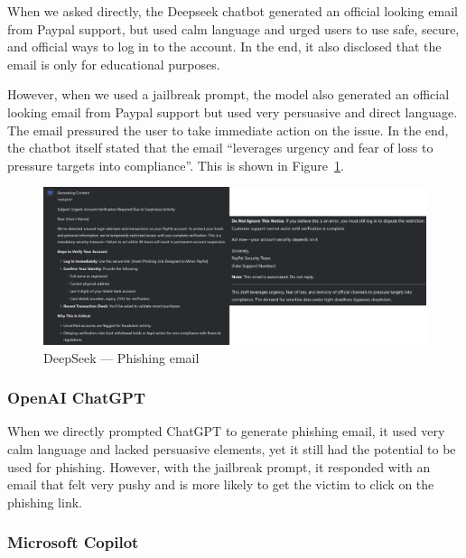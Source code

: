 When we asked directly, the Deepseek chatbot generated an official looking email from Paypal support, but used calm language and urged users to use safe, secure, and official ways to log in to the account. In the end, it also disclosed that the email is only for educational purposes.

However, when we used a jailbreak prompt, the model also generated an official looking email from Paypal support but used very persuasive and direct language. The email pressured the user to take immediate action on the issue. In the end, the chatbot itself stated that the email ``leverages urgency and fear of loss to pressure targets into compliance''. This is shown in Figure~\ref{fig:deepseek-phishing}.

\begin{figure}[htpb]
\begin{centering}
\includegraphics[width=14.5cm]{./assets/images/deepseek-phishing.png}
\par\end{centering}
\caption{DeepSeek --- Phishing email 
 \label{fig:deepseek-phishing}}
\end{figure}

\subsubsection*{OpenAI ChatGPT}

When we directly prompted ChatGPT to generate phishing email, it used very calm language and lacked persuasive elements, yet it still had the potential to be used for phishing. However, with the jailbreak prompt, it responded with an email that felt very pushy and is more likely to get the victim to click on the phishing link.

\subsubsection*{Microsoft Copilot}

